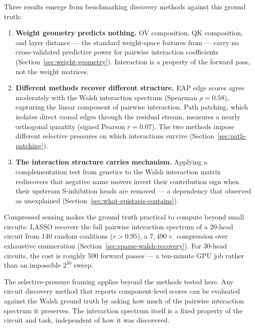 Three results emerge from benchmarking discovery methods against this
ground truth:

\begin{enumerate}
\item \textbf{Weight geometry predicts nothing.} OV composition, QK
  composition, and layer distance --- the standard weight-space features
  from \citet{elhage2021mathematical} --- carry no cross-validated
  predictive power for pairwise interaction coefficients
  (Section~\ref{sec:weight-geometry}). Interaction is a property of the
  forward pass, not the weight matrices.

\item \textbf{Different methods recover different structure.} EAP edge
  scores agree moderately with the Walsh interaction spectrum (Spearman
  $\rho = 0.58$), capturing the linear component of pairwise
  interaction. Path patching, which isolates direct causal edges through
  the residual stream, measures a nearly orthogonal quantity (signed
  Pearson $r = 0.07$). The two methods impose different selective
  pressures on which interactions survive
  (Section~\ref{sec:path-patching}).

\item \textbf{The interaction structure carries mechanism.} Applying a
  complementation test from genetics to the Walsh interaction matrix
  rediscovers that negative name movers invert their contribution sign
  when their upstream S-inhibition heads are removed --- a dependency
  that \citet{wang2022ioi} observed as unexplained
  (Section~\ref{sec:what-epistasis-contains}).
\end{enumerate}

Compressed sensing makes the ground truth practical to compute beyond
small circuits: LASSO recovers the full pairwise interaction spectrum of
a 20-head circuit from 140 random coalitions ($r > 0.95$), a
$7{,}490\times$ compression over exhaustive enumeration
(Section~\ref{sec:sparse-walsh-recovery}). For 30-head circuits, the
cost is roughly 500 forward passes --- a ten-minute GPU job rather than
an impossible $2^{30}$ sweep.

The selective-pressure framing applies beyond the methods tested here.
Any circuit discovery method that reports component-level scores can be
evaluated against the Walsh ground truth by asking how much of the
pairwise interaction spectrum it preserves. The interaction spectrum
itself is a fixed property of the circuit and task, independent of
how it was discovered.
